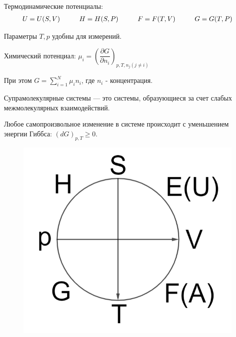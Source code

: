 
\begin{lecture}
	
	Термодинамические потенциалы:
	\begin{equation}	
	\begin{aligned}
		U = U(S,V) \hspace*{1cm} H = H(S,P) \hspace*{1cm} F = F(T,V) \hspace*{1cm} G = G(T,P)
	\end{aligned}
	\end{equation}
	
	Параметры $T,p$ удобны для измерений.
	
	\begin{definition}
	Химический потенциал: $\mu_i = \left( \dfrac{\partial G}{\partial n_i} \right)_{p, T, n_j (j \neq i)}$
	\end{definition}
	
	При этом $G = \sum\limits_{i=1}^{N} \mu_i n_i$, где $n_i$ - концентрация.
	
	\begin{definition}
		Супрамолекулярные системы --- это системы, образующиеся за счет слабых межмолекулярных взаимодействий.
	\end{definition}
	
	Любое самопроизвольное изменение в системе происходит с уменьшением энергии Гиббса: $(d G)_{p,T} \geq 0$.
	\begin{figure}
		\centering\includegraphics[width=\linewidth]{lecture_02/pic1}
	\end{figure}
	\nobreak
	

\end{lecture}
